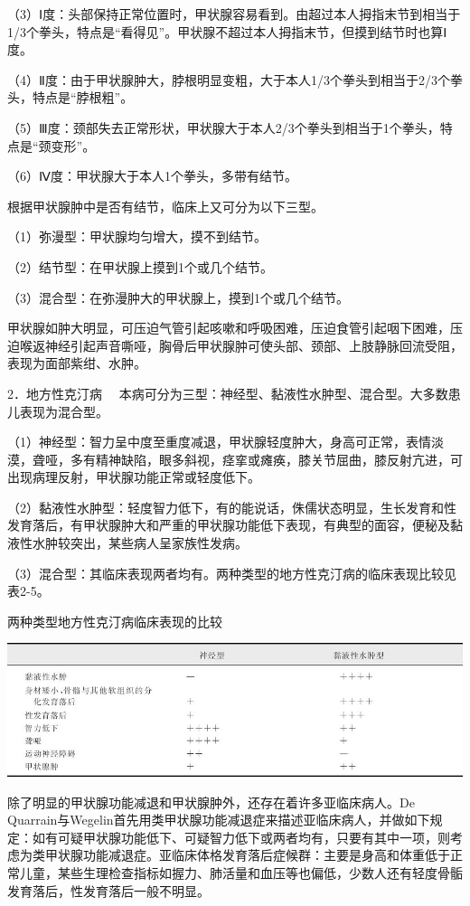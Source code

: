 （3）Ⅰ度：头部保持正常位置时，甲状腺容易看到。由超过本人拇指末节到相当于1/3个拳头，特点是“看得见”。甲状腺不超过本人拇指末节，但摸到结节时也算Ⅰ度。

（4）Ⅱ度：由于甲状腺肿大，脖根明显变粗，大于本人1/3个拳头到相当于2/3个拳头，特点是“脖根粗”。

（5）Ⅲ度：颈部失去正常形状，甲状腺大于本人2/3个拳头到相当于1个拳头，特点是“颈变形”。

（6）Ⅳ度：甲状腺大于本人1个拳头，多带有结节。

根据甲状腺肿中是否有结节，临床上又可分为以下三型。

（1）弥漫型：甲状腺均匀增大，摸不到结节。

（2）结节型：在甲状腺上摸到1个或几个结节。

（3）混合型：在弥漫肿大的甲状腺上，摸到1个或几个结节。

甲状腺如肿大明显，可压迫气管引起咳嗽和呼吸困难，压迫食管引起咽下困难，压迫喉返神经引起声音嘶哑，胸骨后甲状腺肿可使头部、颈部、上肢静脉回流受阻，表现为面部紫绀、水肿。

{2．地方性克汀病}
　本病可分为三型：神经型、黏液性水肿型、混合型。大多数患儿表现为混合型。

（1）神经型：智力呈中度至重度减退，甲状腺轻度肿大，身高可正常，表情淡漠，聋哑，多有精神缺陷，眼多斜视，痉挛或瘫痪，膝关节屈曲，膝反射亢进，可出现病理反射，甲状腺功能正常或轻度低下。

（2）黏液性水肿型：轻度智力低下，有的能说话，侏儒状态明显，生长发育和性发育落后，有甲状腺肿大和严重的甲状腺功能低下表现，有典型的面容，便秘及黏液性水肿较突出，某些病人呈家族性发病。

（3）混合型：其临床表现两者均有。两种类型的地方性克汀病的临床表现比较见表2-5。

\begin{table}[htbp]
\centering
\caption{两种类型地方性克汀病临床表现的比较}
\label{tab2-5}
\includegraphics{./images/Image00014.jpg}
\end{table}

除了明显的甲状腺功能减退和甲状腺肿外，还存在着许多亚临床病人。De
Quarrain与Wegelin首先用类甲状腺功能减退症来描述亚临床病人，并做如下规定：如有可疑甲状腺功能低下、可疑智力低下或两者均有，只要有其中一项，则考虑为类甲状腺功能减退症。亚临床体格发育落后症候群：主要是身高和体重低于正常儿童，某些生理检查指标如握力、肺活量和血压等也偏低，少数人还有轻度骨骺发育落后，性发育落后一般不明显。

